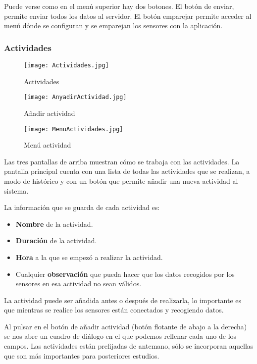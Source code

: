 \documentclass[11pt,spanish]{article}
\begin{document}
Puede verse como en el menú superior hay dos botones. El botón de enviar, permite enviar todos los datos al servidor. El botón emparejar permite acceder al menú dónde se configuran y se emparejan los sensores con la aplicación.
\newpage

\subsubsection{Actividades}
\begin{figure}[!htb]
  \texttt{[image: Actividades.jpg]}
  \caption{Actividades}
\endminipage\hfill
{}
  \texttt{[image: AnyadirActividad.jpg]}
  \caption{Añadir actividad}
\endminipage\hfill
{}%
  \texttt{[image: MenuActividades.jpg]}
  \caption{Menú actividad}
\endminipage
\end{figure}

Las tres pantallas de arriba muestran cómo se trabaja con las actividades. La pantalla principal cuenta con una lista de todas las actividades que se realizan, a modo de histórico y con un botón que permite añadir una nueva actividad al sistema.
\newline

La información que se guarda de cada actividad es:

\begin{itemize}
	\item {\bf Nombre} de la actividad.
	\item {\bf Duración} de la actividad.
	\item {\bf Hora} a la que se empezó a realizar la actividad.
	\item Cualquier {\bf observación} que pueda hacer que los datos recogidos por los sensores en esa actividad no sean válidos.
\end{itemize}

La actividad puede ser añadida antes o después de realizarla, lo importante es que mientras se realice los sensores están conectados y recogiendo datos.
\newline

Al pulsar en el botón de añadir actividad (botón flotante de abajo a la derecha) se nos abre un cuadro de diálogo en el que podemos rellenar cada uno de los campos. Las actividades están prefijadas de antemano, sólo se incorporan aquellas que son más importantes para posteriores estudios.
\newline
\end{document}
